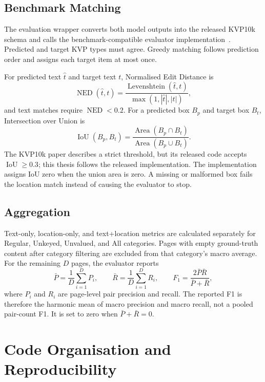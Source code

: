 \subsection{Benchmark Matching}
\label{sec:ned}
\label{sec:iou}

The evaluation wrapper converts both model outputs into the released KVP10k
schema and calls the benchmark-compatible evaluator
implementation~\cite{kvp10k,kvp10k_repository}. Predicted and target KVP types
must agree. Greedy matching follows prediction order and assigns each target
item at most once.

For predicted text $\hat{t}$ and target text $t$, Normalised Edit Distance
is~\cite{levenshtein}
\[
  \operatorname{NED}(\hat{t},t)
  =\frac{\operatorname{Levenshtein}(\hat{t},t)}
         {\max(1,|\hat{t}|,|t|)} ,
\]
and text matches require $\operatorname{NED}<0.2$. For a predicted box $B_p$
and target box $B_t$, Intersection over Union is~\cite{iou}
\[
  \operatorname{IoU}(B_p,B_t)
  =\frac{\operatorname{Area}(B_p\cap B_t)}
         {\operatorname{Area}(B_p\cup B_t)} .
\]
The KVP10k paper describes a strict threshold, but its released code accepts
$\operatorname{IoU}\geq0.3$; this thesis follows the released implementation.
The implementation assigns IoU zero when the union area is zero. A missing or
malformed box fails the location match instead of causing the evaluator to
stop.

\subsection{Aggregation}
\label{sec:f1}

Text-only, location-only, and text+location metrics are calculated separately
for Regular, Unkeyed, Unvalued, and All categories. Pages with empty
ground-truth content after category filtering are excluded from that category's
macro average. For the remaining $D$ pages, the evaluator reports
\[
  \bar P=\frac{1}{D}\sum_{i=1}^{D}P_i,\qquad
  \bar R=\frac{1}{D}\sum_{i=1}^{D}R_i,\qquad
  F_1=\frac{2\bar P\bar R}{\bar P+\bar R},
\]
where $P_i$ and $R_i$ are page-level pair precision and recall. The reported
F1 is therefore the harmonic mean of macro precision and macro recall, not a
pooled pair-count F1. It is set to zero when $\bar P+\bar R=0$.

\section{Code Organisation and Reproducibility}
\label{sec:code-organisation}
\label{sec:reproducibility}

